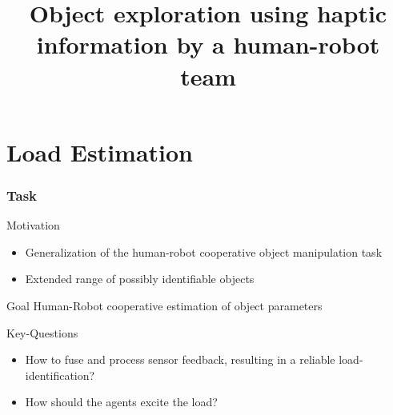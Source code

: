 \documentclass[student,noshadow]{ITRslides}
\title{Object exploration using haptic information by a human-robot team}
\begin{document}
\begin{frame}
	\titlepage
\end{frame}


\section{Load Estimation}

\begin{frame}
	\frametitle{Task}
	
	\begin{block}{Motivation}
		\begin{itemize}
			\item Generalization of the human-robot cooperative object manipulation task
			\item Extended range of possibly identifiable objects
		\end{itemize}
	\end{block}
	
	\begin{block}{Goal}
		Human-Robot cooperative estimation of object parameters
	\end{block}
	\vspace{2mm}
	\begin{block}{Key-Questions}
		\begin{itemize}
			\item How to fuse and process sensor feedback, resulting in a reliable load-identification?
			\item How should the agents excite the load?
		\end{itemize}	   
	\end{block}	
\end{frame}
\end{document}
